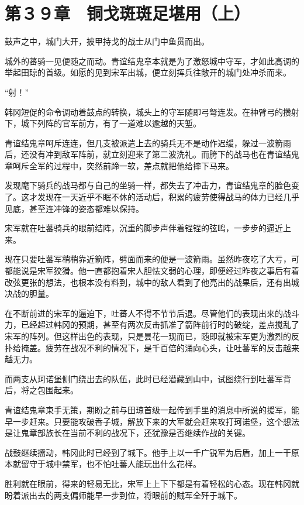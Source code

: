 \section{第３９章　铜戈斑斑足堪用（上）}

鼓声之中，城门大开，披甲持戈的战士从门中鱼贯而出。

城外的蕃骑一见便随之而动。青谊结鬼章本就是为了激怒城中守军，才如此高调的举起田琼的首级。如愿的见到宋军出城，便立刻挥兵往敞开的城门处冲杀而来。

“射！”

韩冈短促的命令调动着鼓点的转换，城头上的守军随即弓弩连发。在神臂弓的攒射下，城下列阵的官军前方，有了一道难以逾越的天堑。

青谊结鬼章呵斥连连，但几支被派遣上去的骑兵无不是动作迟缓，躲过一波箭雨后，还没有冲到敌军阵前，就立刻迎来了第二波洗礼。而胯下的战马也在青谊结鬼章呵斥全军的过程中，突然前蹄一软，差点就把他给摔下马来。

发现麾下骑兵的战马都与自己的坐骑一样，都失去了冲击力，青谊结鬼章的脸色变了。这才发现在一天近乎不眠不休的活动后，积累的疲劳使得战马的体力已经几乎见底，甚至连冲锋的姿态都难以保持。

宋军就在吐蕃骑兵的眼前结阵，沉重的脚步声伴着锃锃的弦鸣，一步步的逼近上来。

现在只要吐蕃军稍稍靠近箭阵，劈面而来的便是一波箭雨。虽然昨夜吃了大亏，可都能说是宋军狡猾。他一直都抱着宋人胆怯文弱的心理，即便经过昨夜之事后有着改弦更张的想法，也根本没有料到，城中的敌人看到了他亮出的战果后，还有出城决战的胆量。

在不断前进的宋军的逼迫下，吐蕃人不得不节节后退。尽管他们的表现出来的战斗力，已经超过韩冈的预期，甚至有两次反击抓准了箭阵前行时的破绽，差点搅乱了宋军的阵列。但这样出色的表现，只是昙花一现而已，随即就被宋军更为激烈的反扑给掩盖。疲劳在战况不利的情况下，是千百倍的涌向心头，让吐蕃军的反击越来越无力。

而两支从珂诺堡侧门绕出去的队伍，此时已经潜藏到山中，试图绕行到吐蕃军背后，将之包围起来。

青谊结鬼章束手无策，期盼之前与田琼首级一起传到手里的消息中所说的援军，能早一步赶来。只要能攻破香子城，解放下来的大军就会赶来攻打珂诺堡，这个想法是让鬼章部族长在当前不利的战况下，还犹豫是否继续作战的关键。

战鼓继续擂动，韩冈此时已经到了城下。他手上以一千广锐军为后盾，加上一干原本就留守于城中禁军，也不怕吐蕃人能玩出什么花样。

胜利就在眼前，得来的轻易无比，宋军上上下下都是有着轻松的心态。现在韩冈就盼着派出去的两支偏师能早一步到位，将眼前的贼军全歼于城下。

